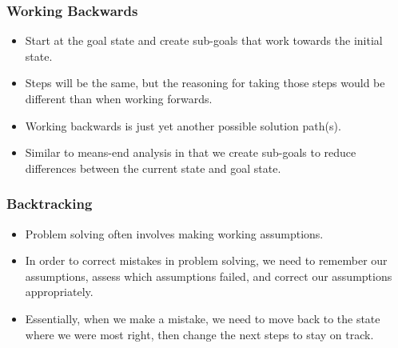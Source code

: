 \documentclass[]{article}
\begin{document}
			\subsubsection{Working Backwards}
				\begin{itemize}
					\item Start at the goal state and create sub-goals that work towards the initial state.
					\item Steps will be the same, but the reasoning for taking those steps would be different than when working forwards.
					\item Working backwards is just yet another possible solution path(s).
					\item Similar to means-end analysis in that we create sub-goals to reduce differences between the current state and goal state.
				\end{itemize}

			\subsubsection{Backtracking}
				\begin{itemize}
					\item Problem solving often involves making working assumptions.
					\item In order to correct mistakes in problem solving, we need to remember our assumptions, assess which assumptions failed, and correct our assumptions appropriately.
					\item Essentially, when we make a mistake, we need to move back to the state where we were most right, then change the next steps to stay on track.
				\end{itemize}
\end{document}
